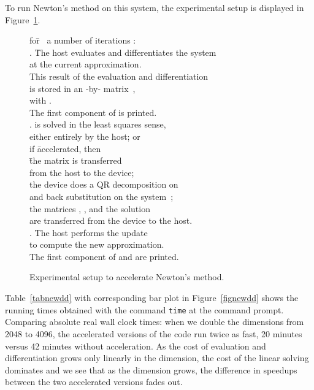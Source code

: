 \documentclass{article}
\begin{document}
To run Newton's method on this system, the experimental setup
is displayed in Figure~\ref{figsetupnew}.
\begin{figure}[hbt]
\begin{center}
\begin{tabbing}
for\= ~a number of iterations : \\
   . \= The host evaluates and differentiates the system \\
   \>    \> at the current approximation. \\
   \>    \> This result of the evaluation and differentiation \\
   \>    \> is stored in an -by- matrix~, \\
   \>    \> with . \\
   \>    \> The first component of  is printed. \\
   . \>  is solved 
            in the least squares sense, \\
   \>    \> either entirely by the host; or \\
   \>    \> if \= accelerated, then \\
   \>    \>     \= the matrix  is transferred \\
   \>    \>    \>     \> from the host to the device; \\
   \>    \>     the device does a QR decomposition on  \\
   \>    \>    \>     \> and back substitution on the 
                      system~;  \\
   \>    \>     the matrices , , and the solution  \\
   \>    \>    \>     \> are transferred from the device to the host. \\
   . \>  The host performs the update  \\
   \>    \>  to compute the new approximation. \\
   \>    \>  The first component of  and  are printed.
\end{tabbing}
\caption{Experimental setup to accelerate Newton's method.}
\label{figsetupnew}
\end{center}
\end{figure}

Table~\ref{tabnewdd} with corresponding bar plot in Figure~\ref{fignewdd}
shows the running times obtained with the
command {\tt time} at the command prompt.
Comparing absolute real wall clock times: 
when we double the dimensions from 2048 to 4096,
the accelerated versions of the code run twice as fast,
20 minutes versus 42 minutes without acceleration.
As the cost of evaluation and differentiation grows only
linearly in the dimension, the cost of the linear solving
dominates and we see that as the dimension grows,
the difference in speedups between the two accelerated versions
fades out.
\end{document}

